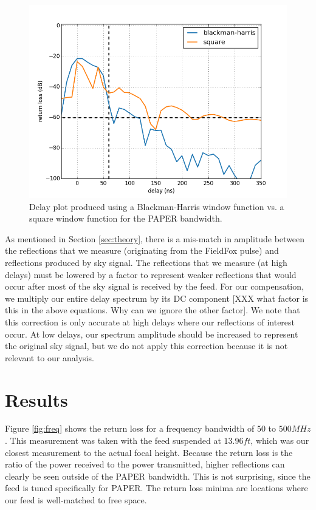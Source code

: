 \documentclass[12pt,preprint]{aastex}
\begin{document}
\begin{figure}
\centering
\includegraphics[totalheight=0.4\textheight]{plots/bh_vs_sq.png}
\caption{Delay plot produced using a Blackman-Harris window function vs. a square window function for the PAPER bandwidth.}
\label{fig:window}
\end{figure}

As mentioned in Section \ref{sec:theory}, there is a mis-match in amplitude
between the reflections that we measure (originating from the FieldFox pulse)
and reflections produced by sky signal. The reflections that we measure (at high
delays) must be lowered by a factor to represent weaker reflections that would
occur after most of the sky signal is received by the feed. For our
compensation, we multiply our entire delay spectrum by its DC component [XXX
what factor is this in the above equations. Why can we ignore the other factor].
We note that this correction is only accurate at high delays where our
reflections of interest occur. At low delays, our spectrum amplitude should be
increased to represent the original sky signal, but we do not apply this
correction because it is not relevant to our analysis.

\section{Results}

Figure \ref{fig:freq} shows the return loss for a frequency bandwidth of $50$ to
$500MHz$. This measurement was taken with the feed suspended at $13.96ft$, which
was our closest measurement to the actual focal height.  Because the return
loss is the ratio of the power received to the power transmitted, higher
reflections can clearly be seen outside of the PAPER bandwidth. This is not
surprising, since the feed is tuned specifically for PAPER. The return loss
minima are locations where our feed is well-matched to free space.
\end{document}
